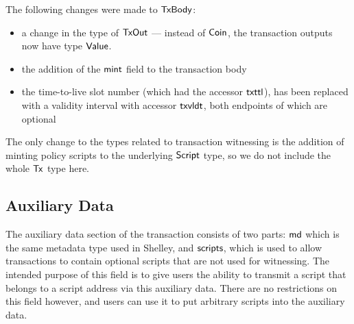 The following changes were made to $\mathsf{TxBody}$:

\begin{itemize}
  \item a change in the type of $\mathsf{TxOut}$ --- instead of
$\mathsf{Coin}$, the transaction outputs now have type $\mathsf{Value}$.
  \item the addition of the $\mathsf{mint}$ field to the transaction body
  \item the time-to-live slot number (which had the accessor $\mathsf{txttl}$),
  has been replaced with a validity interval with accessor $\mathsf{txvldt}$,
  both endpoints of which are optional
\end{itemize}

The only change to the types related to transaction witnessing is the addition
of minting policy scripts to the underlying $\mathsf{Script}$ type, so we do not include the
whole $\mathsf{Tx}$ type here.

\subsection*{Auxiliary Data}

The auxiliary data section of the transaction consists of two parts:
$\mathsf{md}$ which is the same metadata type used in
Shelley, and $\mathsf{scripts}$, which is used to allow transactions to
contain optional scripts that are not used for witnessing. The
intended purpose of this field is to give users the ability to
transmit a script that belongs to a script address via this
auxiliary data. There are no restrictions on this field however, and users
can use it to put arbitrary scripts into the auxiliary data.
